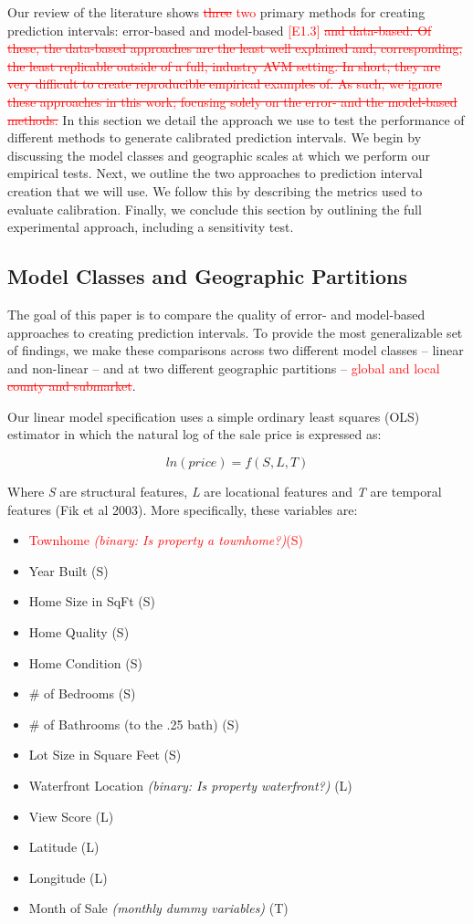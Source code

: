 \documentclass[colTwo]{anon}
\theoremstyle{definition}
\begin{document}
Our review of the literature shows \textcolor{red}{\st{three} two} primary methods for creating prediction intervals: error-based and model-based \textcolor{red}{[E1.3] \st{and data-based.  Of these, the data-based approaches are the least well explained and, corresponding, the least replicable outside of a full, industry AVM setting. In short, they are very difficult to create reproducible empirical examples of.  As such, we ignore these approaches in this work; focusing solely on the error- and the model-based methods.}} In this section we detail the approach we use to test the performance of different methods to generate calibrated prediction intervals. We begin by discussing the model classes and geographic scales at which we perform our empirical tests.  Next, we outline the two approaches to prediction interval creation that we will use.  We follow this by describing the metrics used to evaluate calibration.  Finally, we conclude this section by outlining the full experimental approach, including a sensitivity test. 

\subsection{Model Classes and Geographic Partitions}

The goal of this paper is to compare the quality of error- and model-based approaches to creating prediction intervals.  To provide the most generalizable set of findings, we make these comparisons across two different model classes -- linear and non-linear -- and at two different geographic partitions -- \textcolor{red}{global and local \st{county and submarket}}.  

Our linear model specification uses a simple ordinary least squares (OLS) estimator in which the natural log of the sale price is expressed as:

\[ln(price) = f(S, L, T)\]

Where \textit{S} are structural features, \textit{L} are locational features and \textit{T} are temporal features (Fik et al 2003).  More specifically, these variables are:

\begin{itemize}
\item \textcolor{red}{Townhome \textit{(binary: Is property a townhome?)}(S)}
\item Year Built (S)
\item Home Size in SqFt (S)
\item Home Quality (S)
\item Home Condition (S)
\item \# of Bedrooms (S)
\item \# of Bathrooms (to the .25 bath) (S)
\item Lot Size in Square Feet (S)
\item Waterfront Location \textit{(binary: Is property waterfront?)} (L)
\item View Score (L)
\item Latitude (L)
\item Longitude (L)
\item Month of Sale \textit{(monthly dummy variables)} (T) 
\end{itemize}
\end{document}
